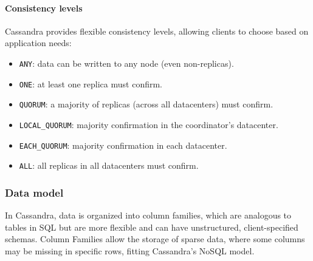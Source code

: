 \paragraph*{Consistency levels}
Cassandra provides flexible consistency levels, allowing clients to choose based on application needs:
\begin{itemize}
    \item \texttt{ANY}: data can be written to any node (even non-replicas).
    \item \texttt{ONE}: at least one replica must confirm.
    \item \texttt{QUORUM}: a majority of replicas (across all datacenters) must confirm.
    \item \texttt{LOCAL\_QUORUM}: majority confirmation in the coordinator's datacenter.
    \item \texttt{EACH\_QUORUM}: majority confirmation in each datacenter.
    \item \texttt{ALL}: all replicas in all datacenters must confirm.
\end{itemize}

\subsubsection{Data model}
In Cassandra, data is organized into column families, which are analogous to tables in SQL but are more flexible and can have unstructured, client-specified schemas. 
Column Families allow the storage of sparse data, where some columns may be missing in specific rows, fitting Cassandra's NoSQL model.

